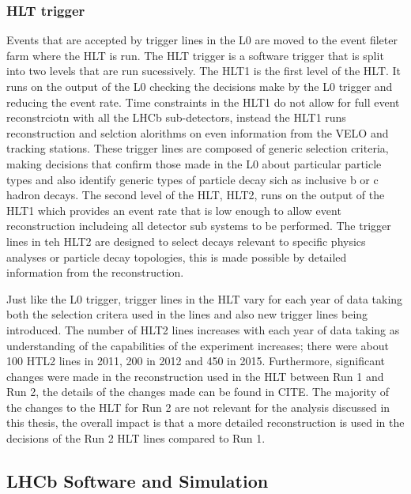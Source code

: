 \subsubsection{HLT trigger}
\label{HLT}

Events that are accepted by trigger lines in the L0 are moved to the event fileter farm where the HLT is run. The HLT trigger is a software trigger that is split into two levels that are run sucessively. The HLT1 is the first level of the HLT. It runs on the output of the L0 checking the decisions make by the L0 trigger and reducing the event rate.%
Time constraints in the HLT1 do not allow for full event reconstrciotn with all the LHCb sub-detectors, instead the HLT1 runs reconstruction and selction alorithms on even information from the VELO and tracking stations. These trigger lines are composed of generic selection criteria, making decisions that confirm those made in the L0 about particular particle types and also identify generic types of particle decay sich as inclusive b or c hadron decays. The second level of the HLT, HLT2, runs on the output of the HLT1 which provides an event rate that is low enough to allow event reconstruction includeing all detector sub systems to be performed. The trigger lines in teh HLT2 are designed to select decays relevant to specific physics analyses or particle decay topologies, this is made possible by detailed information from the reconstruction. 

Just like the L0 trigger, trigger lines in the HLT vary for each year of data taking both the selection critera used in the lines and also new trigger lines being introduced. The number of HLT2 lines increases with each year of data taking as understanding of the capabilities of the experiment increases; there were about 100 HTL2 lines in 2011, 200 in 2012 and 450 in 2015. Furthermore, significant changes were made in the reconstruction used in the HLT between Run 1 and Run 2,  the details of the changes made can be found in CITE. The majority of the changes to the HLT for Run 2 are not relevant for the analysis discussed in this thesis, the overall impact is that a more detailed reconstruction is used in the decisions of the Run 2 HLT lines compared to Run 1.



\subsection{LHCb Software and Simulation}
\label{Software_Simulation}

